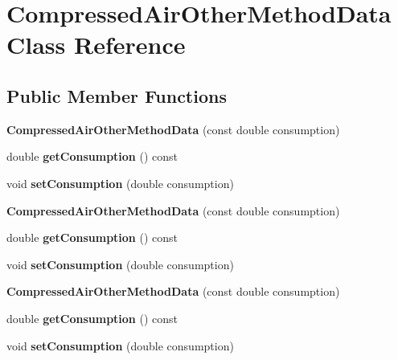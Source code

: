 \hypertarget{class_compressed_air_other_method_data}{}\section{Compressed\+Air\+Other\+Method\+Data Class Reference}
\label{class_compressed_air_other_method_data}
\subsection*{Public Member Functions}
\begin{DoxyCompactItemize}
\item 
\mbox{\label{class_compressed_air_other_method_data_a9d708f0bbbfbac4af197b911059f6bb4}} 
{\bfseries Compressed\+Air\+Other\+Method\+Data} (const double consumption)
\item 
\mbox{\label{class_compressed_air_other_method_data_a75ce4cddaa0809df8cdf7d7a422c2da0}} 
double {\bfseries get\+Consumption} () const
\item 
\mbox{\label{class_compressed_air_other_method_data_a02de2f4c0d953d64339016345981abb0}} 
void {\bfseries set\+Consumption} (double consumption)
\item 
\mbox{\label{class_compressed_air_other_method_data_a9d708f0bbbfbac4af197b911059f6bb4}} 
{\bfseries Compressed\+Air\+Other\+Method\+Data} (const double consumption)
\item 
\mbox{\label{class_compressed_air_other_method_data_a75ce4cddaa0809df8cdf7d7a422c2da0}} 
double {\bfseries get\+Consumption} () const
\item 
\mbox{\label{class_compressed_air_other_method_data_a02de2f4c0d953d64339016345981abb0}} 
void {\bfseries set\+Consumption} (double consumption)
\item 
\mbox{\label{class_compressed_air_other_method_data_a9d708f0bbbfbac4af197b911059f6bb4}} 
{\bfseries Compressed\+Air\+Other\+Method\+Data} (const double consumption)
\item 
\mbox{\label{class_compressed_air_other_method_data_a75ce4cddaa0809df8cdf7d7a422c2da0}} 
double {\bfseries get\+Consumption} () const
\item 
\mbox{\label{class_compressed_air_other_method_data_a02de2f4c0d953d64339016345981abb0}} 
void {\bfseries set\+Consumption} (double consumption)
\end{DoxyCompactItemize}


